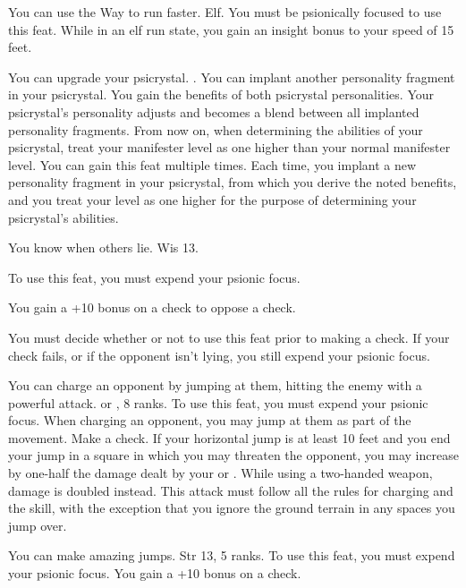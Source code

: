 {You can use the Way to run faster.}
{Elf.}
{You must be psionically focused to use this feat. While in an elf run state, you gain an insight bonus to your speed of 15 feet.}
{}{}

{You can upgrade your psicrystal.}
{.}
{You can implant another personality fragment in your psicrystal. You gain the benefits of both psicrystal personalities. Your psicrystal's personality adjusts and becomes a blend between all implanted personality fragments. From now on, when determining the abilities of your psicrystal, treat your manifester level as one higher than your normal manifester level.}
{}
{You can gain this feat multiple times. Each time, you implant a new personality fragment in your psicrystal, from which you derive the noted benefits, and you treat your level as one higher for the purpose of determining your psicrystal's abilities.}

{You know when others lie.}
{Wis 13.}
{To use this feat, you must expend your psionic focus.

You gain a +10 bonus on a  check to oppose a  check.

You must decide whether or not to use this feat prior to making a  check. If your check fails, or if the opponent isn't lying, you still expend your psionic focus.}
{}{}

{You can charge an opponent by jumping at them, hitting the enemy with a powerful attack.}
{ or ,  8 ranks.}
{To use this feat, you must expend your psionic focus. When charging an opponent, you may jump at them as part of the movement. Make a  check. If your horizontal jump is at least 10 feet and you end your jump in a square in which you may threaten the opponent, you may increase by one-half the damage dealt by your  or . While using a two-handed weapon, damage is doubled instead. This attack must follow all the rules for charging and the  skill, with the exception that you ignore the ground terrain in any spaces you jump over.}
{}{}

{You can make amazing jumps.}
{Str 13,  5 ranks.}
{To use this feat, you must expend your psionic focus. You gain a +10 bonus on a  check.}
{}{}

